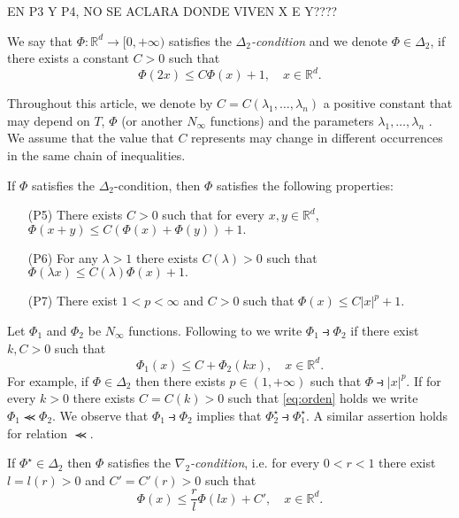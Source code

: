 \documentclass[twoside]{article}
\makeatletter
\theoremstyle{remark}
\newcounter{example}[section]
\def\namedlabel#1#2{\begingroup
    #2%
    \def\@currentlabel{#2}%
    \phantomsection\label{#1}\endgroup
}
\newcommand{\rr}{\mathbb{R}}
\renewcommand{\leq}{\leqslant}
\makeatother
\begin{document}
EN P3 Y P4, NO SE ACLARA DONDE VIVEN X E Y????

We say that  $\Phi:\mathbb{R}^d\rightarrow [0,+\infty)$ satisfies the  \emph{$\Delta_2$-condition} and we denote  $\Phi \in \Delta_2$,
if there exists a  constant $C>0$  such that
\begin{equation}\label{delta2defi}\Phi(2x)\leq C \Phi(x)+1,\quad x\in\rr^d.
\end{equation}


Throughout this article, we denote by $C=C(\lambda_1,\ldots,\lambda_n)$ a positive constant that may depend on $T$, $\Phi$ (or another $N_{\infty}$ functions) and the parameters $\lambda_1,\ldots,\lambda_n$ . We assume that the value that $C$ represents may change in 
different occurrences in the same chain of inequalities. 




If $\Phi$ satisfies the $\Delta_2$-condition, then $\Phi$ satisfies the following properties:
\begin{enumerate}
 \item[\namedlabel{eq:quasi-sub-aditividad}{(P5)}] There exists $C>0$ such that for every $x,y\in \rr^d$, $\Phi(x+y)\leq C (\Phi(x)+\Phi(y))+1.$
\item[\namedlabel{{eq:delta2-lambda}}{(P6)}]  For any $\lambda>1$ there exists $C(\lambda)>0$ such that $\Phi(\lambda x)\leq C(\lambda)\Phi(x)+1.$
\item [\namedlabel{{eq:delta2-power}}{(P7)}] There exist $1<p<\infty$ and $C>0$ such that $\Phi(x)\leq C|x|^p+1$.

\end{enumerate}


Let $\Phi_1$ and $\Phi_2$ be   $N_{\infty}$ functions. Following to \cite{trudinger1974imbedding} we write $\Phi_1\strictif\Phi_2$ if there exist  $k,C>0$ such that
\begin{equation}\label{eq:orden} \Phi_1(x)\leq C+\Phi_2(kx),\quad x\in\rr^d.\end{equation}
For example, if $\Phi \in \Delta_2$ then there exists $p\in (1,+\infty)$ such that $\Phi\strictif |x|^p$.  If for every $k>0$ there exists $C=C(k)>0$ such that \eqref{eq:orden} holds we write  $\Phi_1\llcurly\Phi_2$.  We observe that  $\Phi_1\strictif \Phi_2$ implies that $\Phi^{\star}_2\strictif\Phi^{\star}_1$. A similar assertion holds for relation $\llcurly$. 



If $\Phi^{\star}\in\Delta_2$ then $\Phi$ satisfies the \emph{$\nabla_2$-condition}, i.e.  for every $0<r<1$ there exist $l=l(r)>0$ and $C'=C'(r)>0$ such that 
\begin{equation}\label{eq:nabla2}
  \Phi(x)\leq \frac{r}{l}\Phi(l x)+C',\quad x\in\rr^d.
\end{equation}
\end{document}
